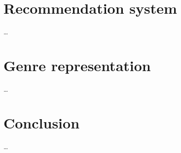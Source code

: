\documentclass[10pt,twocolumn,twoside,slovak,a4paper]{article}
\begin{document}
\section{Recommendation system}\label{recommendationsystem}
\dots

\section{Genre representation}\label{genre}
\dots

\section{Conclusion}\label{conclusion} %
\dots




\end{document}
